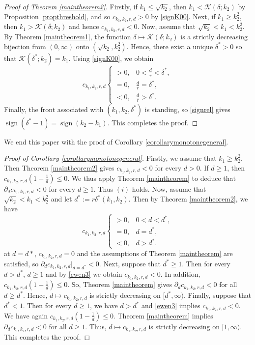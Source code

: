 \documentclass[11pt]{article}
\DeclareMathOperator{\sign}{sign}
\numberwithin{equation}{section}
\newcommand{\CK}[1]{\color{red}{#1}\color{black}}
\newcommand{\1}{\mathbbm{1}}
\numberwithin{equation}{section}
\theoremstyle{definition}
\def \K {\mathcal{K}}
\def \c{c_{k_1,k_2,r,d}}
\numberwithin{equation}{section}
\begin{document}
	\begin{proof}[Proof of Theorem \ref{maintheorem2}] 
		Firstly, if $k_1\leq\sqrt{k_2}$, then $k_1<\K(\delta;k_2)$ by Proposition \ref{propthreshold}, and so $c_{k_1,k_2,r,d}>0$ by \eqref{signK00}. Next, if $k_1\geq k_2^2$, then $k_1>\K(\delta;k_2)$ and hence $c_{k_1,k_2,r,d}<0$.  Now, assume that $\sqrt{k_2}<k_1<k_2^2$. By Theorem \ref{maintheorem1}, the function $\delta \mapsto \K(\delta;k_2)$ is a strictly decreasing bijection from $(0,\infty)$ onto $(\sqrt{k_2},k_2^2)$. Hence, there exist a unique  $\delta^*>0$ so that	$\mathcal K(\delta^*;k_2)=k_1$. Using \eqref{signK00}, we obtain	
		\begin{equation*}
			\c \left\{ 
			\begin{array}{llllll}
				>0, &  0<\frac{d}{r}<\delta^*,\\
				=0, & \frac{d}{r}=\delta^*,\\
				<0, &\frac{d}{r}>\delta^*.
			\end{array} 
			\right.
		\end{equation*}
		Finally, the front associated with $(k_1,k_2,\delta^*)$ is standing, so \eqref{signrel} gives
		$\sign(\delta^*-1)=\sign(k_2-k_1)$. This completes the proof.
	\end{proof}

We end this paper with the proof of Corollary \ref{corollarymonotonegeneral}.
\begin{proof}[Proof of Corollary \ref{corollarymonotonegeneral}]
Firstly, we assume that $k_1\geq k_2^2$.  Then Theorem \ref{maintheorem2} gives $\c<0$ for every $d>0$. If $d\geq 1$, then $\c\left(1-\frac{1}{d}\right) \leq 0$. We thus apply Theorem \ref{maintheorem} to deduce that $\partial_d\c<0$ for every $d \geq 1$. Thus $(i)$ holds. Now, assume that $\sqrt{k_2}<k_1<k_2^2$ and let $d^*:=r\delta^*(k_1,k_2)$.	Then by Theorem \ref{maintheorem2}, we have 
\begin{equation}\label{ewen3}
	\c
	\begin{cases}
		>0,&0<d<d^*,\\
		=0,&d=d^*,\\
		<0,&d>d^*.
	\end{cases}
\end{equation}
at $d=d*$, $\c=0$ and the assumptions of Theorem \ref{maintheorem} are satisfied, so $\partial_d\c|_{d=d^*}<0$.  Next, suppose that $d^*\geq 1$. Then for every $d>d^*$, $d\geq 1$ and by \eqref{ewen3} we obtain $\c<0$. In addition, $c_{k_1,k_2,r,d}\left(1-\frac{1}{d}\right) \leq 0$. So, Theorem \ref{maintheorem} gives $\partial_d\c<0$ for all $d\geq d^*$. Hence, $d\mapsto \c$ is strictly decreasing on $[d^*, \infty)$. Finally, suppose that $d^*<1$. Then for every $d \geq 1$, we have $d>d^*$ and \eqref{ewen3} implies $\c<0$. We have again $\c\left(1-\frac{1}{d}\right) \leq 0$. Theorem \ref{maintheorem} implies $\partial_d\c<0$ for all $d \geq 1$. Thus, $d\mapsto \c$ is strictly decreasing on $[1,\infty)$. This completes the proof. 
\end{proof}






\end{document}
